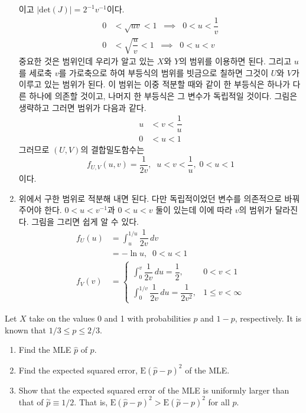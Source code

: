 \documentclass[answers]{exam}
\begin{document}
\begin{questions}
\begin{solution}
\begin{enumerate}
    이고 $\left|\mathrm{det}\left(J\right)\right|=2^{-1}v^{-1}$이다.
    \begin{align}
      0 &< \sqrt{uv} < 1 \;\; \implies \;\; 0 < u < \dfrac{1}{v}\\
      0 &< \sqrt{\dfrac{u}{v}}<1 \;\; \implies \;\; 0 < u < v
    \end{align}
    중요한 것은 범위인데 우리가 알고 있는 $X$와 $Y$의 범위를 이용하면 된다. 그리고 $u$를 세로축 $v$를 가로축으로 하여 부등식의 범위를 빗금으로 칠하면 그것이 $U$와 $V$가 이루고 있는 범위가 된다. 이 범위는 이중 적분할 때와 같이 한 부등식은 하나가 다른 하나에 의존할 것이고, 나머지 한 부등식은 그 변수가 독립적일 것이다. 그림은 생략하고 그러면 범위가 다음과 같다.
    \begin{align}
      u &< v < \dfrac{1}{u}\\
      0 &< u < 1
    \end{align}
    그러므로 $(U,V)$의 결합밀도함수는
    $$
      f_{U,V}\left(u,v\right) = \dfrac{1}{2v}, \;\; u < v< \dfrac{1}{u},\; 0<u<1
    $$
    이다.
    \item 위에서 구한 범위로 적분해 내면 된다. 다만 독립적이었던 변수를 의존적으로 바꿔주어야 한다. $0<u<v^{-1}$과 $0<u<v$ 둘이 있는데 이에 따라 $v$의 범위가 달라진다. 그림을 그리면 쉽게 알 수 있다.
    \begin{align}
      f_{U}\left(u\right) &= \int_{u}^{1/u}\dfrac{1}{2v}\,dv \\
      &= -\ln u,\;\; 0<u<1\\
      f_{V}\left(v\right) &= \begin{cases} \displaystyle \int_{0}^{v}\dfrac{1}{2v}\,du=\dfrac{1}{2},& 0<v<1 \\\displaystyle \int_{0}^{1/v}\dfrac{1}{2v}\,du=\dfrac{1}{2v^{2}}, & 1 \leq v < \infty \end{cases}
    \end{align}
    \end{enumerate}
   \end{solution}
   \question
   Let $X$ take on the values 0 and 1 with probabilities $p$ and $1-p$, respectively. It is known that $1/3\leq p \leq 2/3$.
   \begin{enumerate}
    \item Find the MLE $\hat{p}$ of $p$.
    \item Find the expected squared error, $\mathrm{E}\left(\hat{p}-p\right)^{2}$ of the MLE.
    \item Show that the expected squared error of the MLE is uniformly larger than that of $\overset{\sim}{p}\equiv 1/2$. That is, $\mathrm{E}\left(\hat{p}-p\right)^{2}>\mathrm{E}\left(\overset{\sim}{p}-p\right)^{2}$ for all $p$.

\end{enumerate}
\end{questions}
\end{document}
